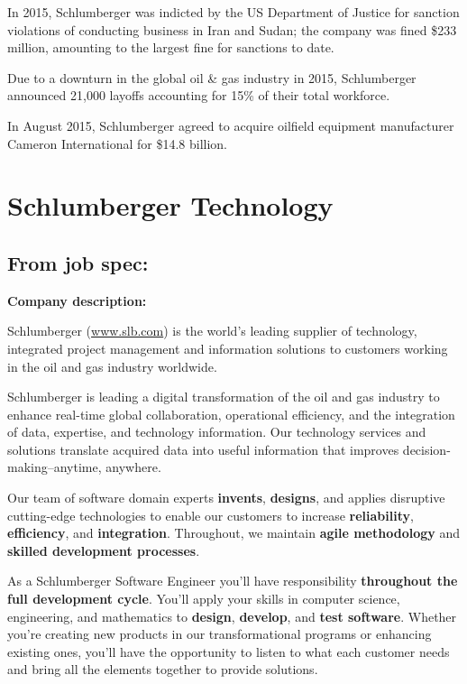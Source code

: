 \documentclass[12pt,a4paper]{article}
\begin{document}
In 2015, Schlumberger was indicted by the US Department of Justice for
sanction violations of conducting business in Iran and Sudan; the company
was fined \$233 million, amounting to the largest fine for sanctions to
date.

Due to a downturn in the global oil \& gas industry in 2015, Schlumberger
announced 21,000 layoffs accounting for 15\% of their total workforce.

In August 2015, Schlumberger agreed to acquire oilfield equipment
manufacturer Cameron International for \$14.8 billion.



\section{Schlumberger Technology}


\subsection{From job spec:}

\textbf{Company description:}

Schlumberger (\url{www.slb.com}) is the world's leading supplier of
technology, integrated project management and information solutions to
customers working in the oil and gas industry worldwide.  

Schlumberger is leading a digital transformation of the oil and gas industry
to enhance real-time global collaboration, operational efficiency, and the
integration of data, expertise, and technology information. Our technology
services and solutions translate acquired data into useful information that
improves decision-making--anytime, anywhere.

Our team of software domain experts \textbf{invents}, \textbf{designs}, and
applies disruptive cutting-edge technologies to enable our customers to
increase \textbf{reliability}, \textbf{efficiency}, and
\textbf{integration}. Throughout, we maintain \textbf{agile methodology} and
\textbf{skilled development processes}.

As a Schlumberger Software Engineer you'll have responsibility
\textbf{throughout the full development cycle}. You'll apply your skills in
computer science, engineering, and mathematics to \textbf{design},
\textbf{develop}, and \textbf{test software}. Whether you're creating new
products in our transformational programs or enhancing existing ones, you'll
have the opportunity to listen to what each customer needs and bring all the
elements together to provide solutions.
\end{document}
